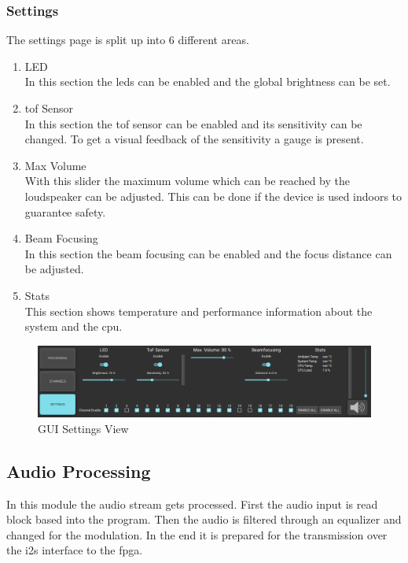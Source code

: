 \subsubsection{Settings}
The settings page is split up into 6 different areas.
\begin{enumerate}
    \item LED \\
    In this section the \acrshort{led}s can be enabled and the global brightness can be set. 
    \item \acrshort{tof} Sensor \\
    In this section the \acrshort{tof} sensor can be enabled and its sensitivity can be changed. To get a visual feedback of the sensitivity a gauge is present.
    \item Max Volume \\
    With this slider the maximum volume which can be reached by the loudspeaker can be adjusted. This can be done if the device is used indoors to guarantee safety.  
    \item Beam Focusing \\ 
    In this section the beam focusing can be enabled and the focus distance can be adjusted. 
    \item Stats \\
    This section shows temperature and performance information about the system and the \acrshort{cpu}.
\end{enumerate}
\begin{figure}[h!]
    \centering
    \includegraphics[width=\textwidth]{images/4_Design/Software/Page_Settings.PNG}
    \caption{GUI Settings View}
    \label{4_fig:gui_settings}
\end{figure}

\subsection{Audio Processing}
In this module the audio stream gets processed. First the audio input is read block based into the program. Then the audio is filtered through an equalizer and changed for the modulation. In the end it is prepared for the transmission over the \acrshort{i2s} interface to the \acrshort{fpga}.
